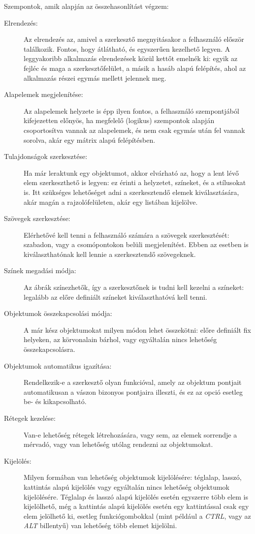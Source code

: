 
Szempontok, amik alapján az összehasonlítást végzem:

\begin{description}
	\item[Elrendezés:] Az elrendezés az, amivel a szerkesztő megnyitásakor a felhasználó először találkozik. Fontos, hogy átlátható, és egyszerűen kezelhető legyen. A leggyakoribb alkalmazás elrendezések közül kettőt emelnék ki: egyik az fejléc és maga a szerkesztőfelület, a másik a hasáb alapú felépítés, ahol az alkalmazás részei egymás mellett jelennek meg. 
	\item[Alapelemek megjelenítése:] Az alapelemek helyzete is épp ilyen fontos, a felhasználó szempontjából kifejezetten előnyös, ha megfelelő (logikus) szempontok alapján csoportosítva vannak az alapelemek, és nem csak egymás után fel vannak sorolva, akár egy mátrix alapú felépítésben.
	\item[Tulajdonságok szerkesztése:] Ha már leraktunk egy objektumot, akkor elvárható az, hogy a lent lévő elem szerkeszthető is legyen: ez érinti a helyzetet, színeket, és a stílusokat is. Itt szükséges lehetőséget adni a szerkesztendő elemek kiválasztására, akár magán a rajzolófelületen, akár egy listában kijelölve.
	\item[Szövegek szerkesztése:] Elérhetővé kell tenni a felhasználó számára a szövegek szerkesztését: szabadon, vagy a csomópontokon belüli megjelenítést. Ebben az esetben is kiválaszthatónak kell lennie a szerkesztendő szövegeknek.
	\item[Színek megadási módja:] Az ábrák színezhetők, így a szerkesztőnek is tudni kell kezelni a színeket: legalább az előre definiált színeket kiválaszthatóvá kell tenni.
	\item[Objektumok összekapcsolási módja:] A már kész objektumokat milyen módon lehet összekötni: előre definiált fix helyeken, az körvonalain bárhol, vagy egyáltalán nincs lehetőség összekapcsolásra. 
	\item[Objektumok automatikus igazítása:] Rendelkezik-e a szerkesztő olyan funkcióval, amely az objektum pontjait automatikusan a vászon bizonyos pontjaira illeszti, és ez az opció esetleg be- és kikapcsolható.
	\item[Rétegek kezelése:] Van-e lehetőség rétegek létrehozására, vagy sem, az elemek sorrendje a mérvadó, vagy van lehetőség utólag rendezni az objektumokat. 
	\item[Kijelölés:] Milyen formában van lehetőség objektumok kijelölésére: téglalap, lasszó, kattintás alapú kijelölés vagy egyáltalán nincs lehetőség objektumok kijelölésére. Téglalap és lasszó alapú kijelölés esetén egyszerre több elem is kijelölhető, még a kattintás alapú kijelölés esetén egy kattintással csak egy elem jelölhető ki, esetleg funkciógombokkal (mint például a \textit{CTRL}, vagy az \textit{ALT} billentyű) van lehetőség több elemet kijelölni.

\end{description}
